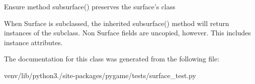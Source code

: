 \begin{DoxyVerb}Ensure method subsurface() preserves the surface's class

When Surface is subclassed, the inherited subsurface() method will
return instances of the subclass. Non Surface fields are uncopied,
however. This includes instance attributes.
\end{DoxyVerb}
 

The documentation for this class was generated from the following file\+:\begin{DoxyCompactItemize}
\item 
venv/lib/python3./site-\/packages/pygame/tests/surface\+\_\+test.\+py\end{DoxyCompactItemize}
